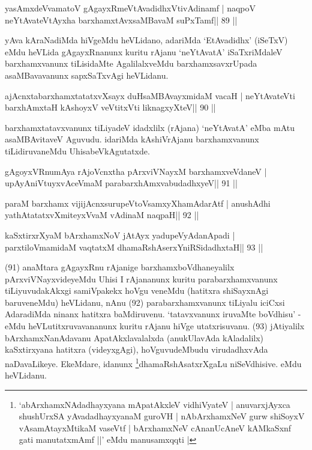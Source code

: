 \begin{shl}
yasAmxdeVvamatoV gAgayxRmeVtAvadidhxVtivAdinamf |
naqpoV neYtAvateVtAyxha barxhamxtAvxsaMBavaM suPxTamf\hfill || 89 ||
\end{shl}

\begin{artha}
yAva kAraNadiMda hiVgeMdu heVLidano, adariMda `EtAvadidhx' (iSeTxV) eMdu heVLida gAgayxRnanunx kuritu rAjanu `neYtAvatA' iSaTxriMdaleV barxhamxvanunx tiLisidaMte AgalilalxveMdu barxhamxsavxrUpada asaMBavavanunx sapxSaTxvAgi heVLidanu.
\end{artha}


\begin{shl}
ajAcnxtabarxhamxtatatxvXsayx duHsaMBAvayxmidaM vacaH |
neYtAvateVti barxhAmxtaH kAshoyxV veVtitxVti liknagxyXteV\hfill || 90 ||
\end{shl}

\begin{artha}
barxhamxtatavxvanunx tiLiyadeV idadxlilx (rAjana) `neYtAvatA' eMba mAtu  asaMBAvitaveV Aguvudu. idariMda kAshiVrAjanu barxhamxvanunx tiLidiruvaneMdu UhisabeVkAgutatxde.
\end{artha}

\begin{shl}
gAgoyxVR\s numAya rAjoVcnx\s tha pArxviVNayxM barxhamxveVdaneV |
upAyAniVtuyxvAceVmaM parabarxhAmxvabudadhxyeV\hfill || 91 ||
\end{shl}

\begin{shl}
paraM barxhamx vijijAcnxsurupeVtoV\s samxyXhamAdarAtf |
anushAdhi yathAtatatxvXmiteyxVvaM vAdinaM naqpaH\hfill || 92 ||
\end{shl}

\begin{shl}
kaSxtirxrXyaM bArxhamxNoV jAtAyx yadupeVyAdanApadi |
parxtiloVmamidaM vaqtatxM dhamaRshAserxYniRSidadhxtaH\hfill || 93 ||
\end{shl}

\begin{artha}
(91) anaMtara gAgayxRnu rAjanige barxhamxboVdhaneyalilx pArxviVNayxvideyeMdu Uhisi I rAjananunx kuritu parabarxhamxvanunx tiLiyuvudakAkxgi samiVpakekx hoVgu veneMdu (hatitxra shiSayxnAgi baruveneMdu) heVLidanu, nAnu (92) parabarxhamxvanunx tiLiyalu iciCxsi AdaradiMda ninanx hatitxra baMdiruvenu. `tatavxvanunx iruvaMte boVdhisu' - eMdu heVLutitxruvavananunx kuritu rAjanu hiVge utatxrisuvanu. (93) jAtiyalilx bArxhamxNanAdavanu ApatAkxlavalalxda (anukUlavAda kAladalilx) kaSxtirxyana hatitxra (videyxgAgi), hoVguvudeMbudu virudadhxvAda naDavaLikeye. EkeMdare, idanunx \footnote[10]{`abArxhamxNAdadhayxyana mApatAkxleV vidhiVyateV | anuvarxjAyxca shushUrxSA yAvadadhayxyanaM guroVH | nAbArxhamxNeV gurw shiSoyxV vAsamAtayxMtikaM vaseVtf | bArxhamxNeV cAnanUcAneV kAMkaSxnf gati manutatxmAmf ||' eMdu manusamxqqti |}dhamaRshAsatxrXgaLu niSeVdhisive. eMdu heVLidanu.
\end{artha} 

